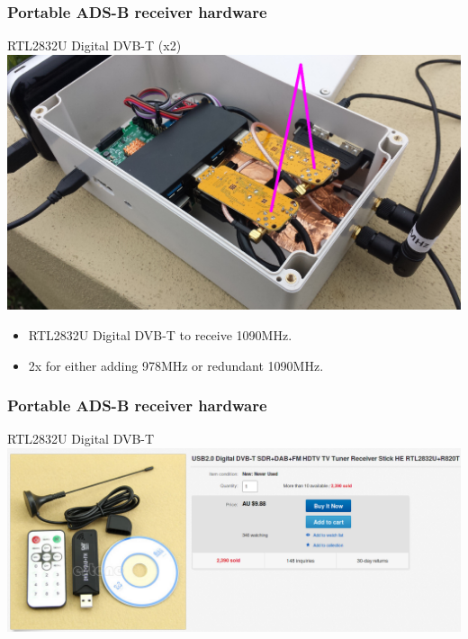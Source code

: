 \begin{frame}
\frametitle{Portable ADS-B receiver hardware}
\begin{block}{RTL2832U Digital DVB-T (x2)}
\includegraphics[height=0.5\textheight]{image/adsb-hardware-dvb.png}
\begin{itemize}
\item RTL2832U Digital DVB-T to receive 1090MHz.
\item 2x for either adding 978MHz or redundant 1090MHz.
\end{itemize}
\end{block}
\end{frame}

\begin{frame}
\frametitle{Portable ADS-B receiver hardware}
\begin{block}{RTL2832U Digital DVB-T}
\includegraphics[height=0.4\textheight]{image/ebay-dvb-tuner.png}
\end{block}
\end{frame}

